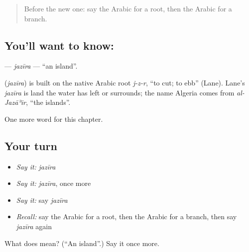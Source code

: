 \label{lesson:AR-C131-jazira}



\begin{quote}
Before the new one: say the Arabic for a root, then the Arabic for a branch.
\end{quote}

\subsection*{You'll want to know: }
\textbf{} — \emph{jazīra} — \textquotedblleft{}an island\textquotedblright{}.

\begin{cousinweb}
\textbf{} (\emph{jazīra}) is built on the native Arabic root \emph{j-z-r}, \textquotedblleft{}to cut; to ebb\textquotedblright{} (Lane). Lane's \emph{jazīra} is land the water has left or surrounds; the name Algeria comes from \emph{al-Jazāʾir}, \textquotedblleft{}the islands\textquotedblright{}.
\end{cousinweb}

\begin{grammarlens}[title={What you've built}]
One more word for this chapter.
\end{grammarlens}

\subsection*{Your turn}
\begin{itemize}
\raggedright
  \item \emph{Say it:} \emph{jazīra}
  \item \emph{Say it:} \emph{jazīra}, once more
  \item \emph{Say it:} say \emph{jazīra}
  \item \emph{Recall:} say the Arabic for a root, then the Arabic for a branch, then say \emph{jazīra} again
\end{itemize}

\begin{tcolorbox}[breakable,colback=teal!4,colframe=teal!35!black,title={Before you move on}]
What does  mean? (\textquotedblleft{}An island\textquotedblright{}.) Say it once more.
\end{tcolorbox}
